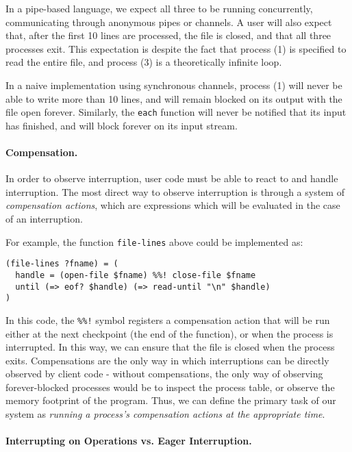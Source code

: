 \documentclass[format=sigconf, review=true, draft=true, screen=true]{acmart}
\begin{document}
In a pipe-based language, we expect all three to be running concurrently, communicating through anonymous pipes or channels.
A user will also expect that, after the first 10 lines are processed, the file is closed, and that all three processes exit.
This expectation is despite the fact that process (1) is specified to read the entire file, and process (3) is a theoretically infinite loop.

In a naive implementation using synchronous channels, process (1) will never be able to write more than 10 lines, and will remain blocked on its output with the file open forever.
Similarly, the \verb/each/ function will never be notified that its input has finished, and will block forever on its input stream.

\paragraph{Compensation.} In order to observe interruption, user code must be able to react to and handle interruption. The most direct way to observe interruption is through a system of \emph{compensation actions}, which are expressions which will be evaluated in the case of an interruption.

For example, the function \verb/file-lines/ above could be implemented as:

\begin{lstlisting}
(file-lines ?fname) = (
  handle = (open-file $fname) %%! close-file $fname
  until (=> eof? $handle) (=> read-until "\n" $handle)
)
\end{lstlisting}

In this code, the \verb/%%!/ symbol registers a compensation action that will be run either at the next checkpoint (the end of the function), or when the process is interrupted. In this way, we can ensure that the file is closed when the process exits. Compensations are the only way in which interruptions can be directly observed by client code - without compensations, the only way of observing forever-blocked processes would be to inspect the process table, or observe the memory footprint of the program. Thus, we can define the primary task of our system as \emph{running a process's compensation actions at the appropriate time}.

\paragraph{Interrupting on Operations vs. Eager Interruption.}
\end{document}
